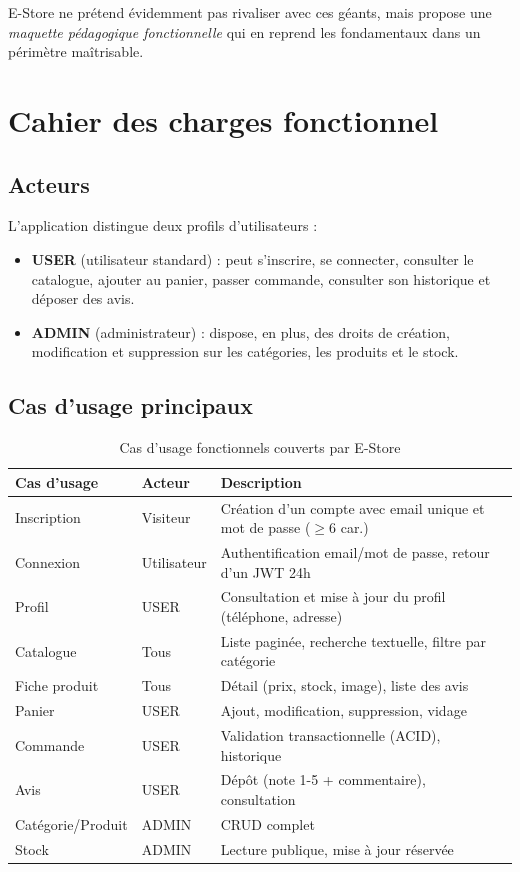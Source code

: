 \documentclass[11pt,a4paper,oneside]{report}
\begin{document}
E-Store ne prétend évidemment pas rivaliser avec ces géants, mais propose
une \textit{maquette pédagogique fonctionnelle} qui en reprend les
fondamentaux dans un périmètre maîtrisable.

\section{Cahier des charges fonctionnel}

\subsection{Acteurs}

L'application distingue deux profils d'utilisateurs :

\begin{itemize}
  \item \textbf{USER} (utilisateur standard) : peut s'inscrire, se connecter,
    consulter le catalogue, ajouter au panier, passer commande, consulter
    son historique et déposer des avis.
  \item \textbf{ADMIN} (administrateur) : dispose, en plus, des droits de
    création, modification et suppression sur les catégories, les produits
    et le stock.
\end{itemize}

\subsection{Cas d'usage principaux}

\begin{table}[htbp]
\centering
\caption{Cas d'usage fonctionnels couverts par E-Store}
\label{tab:usecases}
\small
\begin{tabularx}{\textwidth}{p{3.5cm}lX}
\toprule
\textbf{Cas d'usage} & \textbf{Acteur} & \textbf{Description}\\
\midrule
Inscription   & Visiteur & Création d'un compte avec email unique et mot de passe ($\geq$6 car.)\\
Connexion     & Utilisateur & Authentification email/mot de passe, retour d'un JWT 24h\\
Profil        & USER & Consultation et mise à jour du profil (téléphone, adresse)\\
Catalogue     & Tous & Liste paginée, recherche textuelle, filtre par catégorie\\
Fiche produit & Tous & Détail (prix, stock, image), liste des avis\\
Panier        & USER & Ajout, modification, suppression, vidage\\
Commande      & USER & Validation transactionnelle (ACID), historique\\
Avis          & USER & Dépôt (note 1-5 + commentaire), consultation\\
Catégorie/Produit & ADMIN & CRUD complet\\
Stock         & ADMIN & Lecture publique, mise à jour réservée\\
\bottomrule
\end{tabularx}
\end{table}
\end{document}

